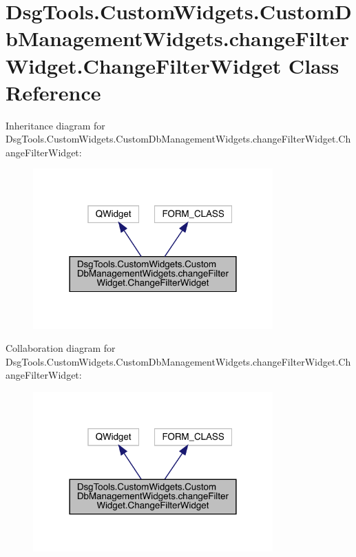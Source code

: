 \hypertarget{class_dsg_tools_1_1_custom_widgets_1_1_custom_db_management_widgets_1_1change_filter_widget_1_1_change_filter_widget}{}\section{Dsg\+Tools.\+Custom\+Widgets.\+Custom\+Db\+Management\+Widgets.\+change\+Filter\+Widget.\+Change\+Filter\+Widget Class Reference}
\label{class_dsg_tools_1_1_custom_widgets_1_1_custom_db_management_widgets_1_1change_filter_widget_1_1_change_filter_widget}


Inheritance diagram for Dsg\+Tools.\+Custom\+Widgets.\+Custom\+Db\+Management\+Widgets.\+change\+Filter\+Widget.\+Change\+Filter\+Widget\+:
\nopagebreak
\begin{figure}[H]
\begin{center}
\leavevmode
\includegraphics[width=261pt]{class_dsg_tools_1_1_custom_widgets_1_1_custom_db_management_widgets_1_1change_filter_widget_1_1_6abf6c3dd5b82dc5a6a271ca5792e6a5}
\end{center}
\end{figure}


Collaboration diagram for Dsg\+Tools.\+Custom\+Widgets.\+Custom\+Db\+Management\+Widgets.\+change\+Filter\+Widget.\+Change\+Filter\+Widget\+:
\nopagebreak
\begin{figure}[H]
\begin{center}
\leavevmode
\includegraphics[width=261pt]{class_dsg_tools_1_1_custom_widgets_1_1_custom_db_management_widgets_1_1change_filter_widget_1_1_7f436d8e6951b0d8833e70dea5a4e8fb}
\end{center}
\end{figure}
